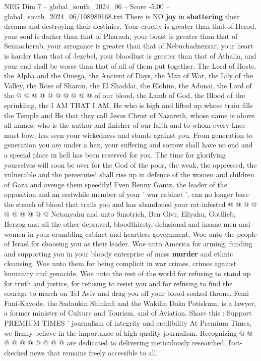 \begin{textsample}{NEG Dim 7 – global\_south\_2024\_06 – Score -5.00 – global\_south\_2024\_06/108989168.txt}
There is NO \textbf{joy} in \textbf{shattering} their dreams and destroying their destinies.
Your cruelty is greater than that of Herod, your soul is darker than that of Pharaoh, your boast is greater than that of Sennacherub, your arrogance is greater than that of Nebuchadnezzar, your heart is harder than that of Jezebel, your bloodlust is greater than that of Athalia, and your end shall be worse than that of all of them put together.
The Lord of Hosts, the Alpha and the Omega, the Ancient of Days, the Man of War, the Lily of the Valley, the Rose of Sharon, the El Shaddai, the Elohim, the Adonai, the Lord of the @ @ @ @ @ @ @ @ @ @ of our blood, the Lamb of God, the Blood of the sprinkling, the I AM THAT I AM, He who is high and lifted up whose train fills the Temple and He that they call Jesus Christ of Nazareth, whose name is above all names, who is the author and finisher of our faith and to whom every knee must bow, has seen your wickedness and stands against you.
From generation to generation you are under a hex, your suffering and sorrow shall have no end and a special place in hell has been reserved for you.
The time for glorifying yourselves will soon be over for the God of the poor, the weak, the oppressed, the vulnerable and the persecuted shall rise up in defence of the women and children of Gaza and avenge them speedily!
Even Benny Gantz, the leader of the opposition and an erstwhile member of your ' war cabinet ', can no longer bare the stench of blood that trails you and has abandoned your rat-infested @ @ @ @ @ @ @ @ @ @ Netanyahu and unto Smotrich, Ben Givr, Eliyahu, Gotllieb, Herzog and all the other depraved, bloodthirsty, delusional and insane men and women in your crumbling cabinet and heartless government.
Woe unto the people of Israel for choosing you as their leader.
Woe unto America for arming, funding and supporting you in your bloody enterprise of mass \textbf{murder} and ethnic cleansing.
Woe unto them for being complicit in war crimes, crimes against humanity and genocide.
Woe unto the rest of the world for refusing to stand up for truth and justice, for refusing to resist you and for refusing to find the courage to march on Tel Aviv and drag you off your blood-soaked throne.
Femi Fani-Kayode, the Sadaukin Shinkafi and the Wakilin Doka Potiskum, is a lawyer, a former minister of Culture and Tourism, and of Aviation.
Share this : Support PREMIUM TIMES ' journalism of integrity and credibility At Premium Times, we firmly believe in the importance of high-quality journalism.
Recognizing @ @ @ @ @ @ @ @ @ @ are dedicated to delivering meticulously researched, fact-checked news that remains freely accessible to all.

\end{textsample}
